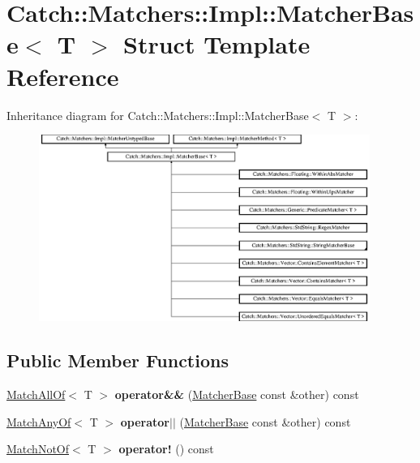 \hypertarget{struct_catch_1_1_matchers_1_1_impl_1_1_matcher_base}{}\section{Catch\+:\+:Matchers\+:\+:Impl\+:\+:Matcher\+Base$<$ T $>$ Struct Template Reference}
\label{struct_catch_1_1_matchers_1_1_impl_1_1_matcher_base}
Inheritance diagram for Catch\+:\+:Matchers\+:\+:Impl\+:\+:Matcher\+Base$<$ T $>$\+:\begin{figure}[H]
\begin{center}
\leavevmode
\includegraphics[height=6.092978cm]{struct_catch_1_1_matchers_1_1_impl_1_1_matcher_base}
\end{center}
\end{figure}
\subsection*{Public Member Functions}
\begin{DoxyCompactItemize}
\item 
\mbox{\label{struct_catch_1_1_matchers_1_1_impl_1_1_matcher_base_a23c336f6d9457735ddc8dc7ea864d7c9}} 
\mbox{\hyperlink{struct_catch_1_1_matchers_1_1_impl_1_1_match_all_of}{Match\+All\+Of}}$<$ T $>$ {\bfseries operator\&\&} (\mbox{\hyperlink{struct_catch_1_1_matchers_1_1_impl_1_1_matcher_base}{Matcher\+Base}} const \&other) const
\item 
\mbox{\label{struct_catch_1_1_matchers_1_1_impl_1_1_matcher_base_a5f8542b8f1567a6f9c65d0a6da7b679b}} 
\mbox{\hyperlink{struct_catch_1_1_matchers_1_1_impl_1_1_match_any_of}{Match\+Any\+Of}}$<$ T $>$ {\bfseries operator$\vert$$\vert$} (\mbox{\hyperlink{struct_catch_1_1_matchers_1_1_impl_1_1_matcher_base}{Matcher\+Base}} const \&other) const
\item 
\mbox{\label{struct_catch_1_1_matchers_1_1_impl_1_1_matcher_base_a5bb94bf2ff5c7ef73b7c11eb173bdf3b}} 
\mbox{\hyperlink{struct_catch_1_1_matchers_1_1_impl_1_1_match_not_of}{Match\+Not\+Of}}$<$ T $>$ {\bfseries operator!} () const
\end{DoxyCompactItemize}
